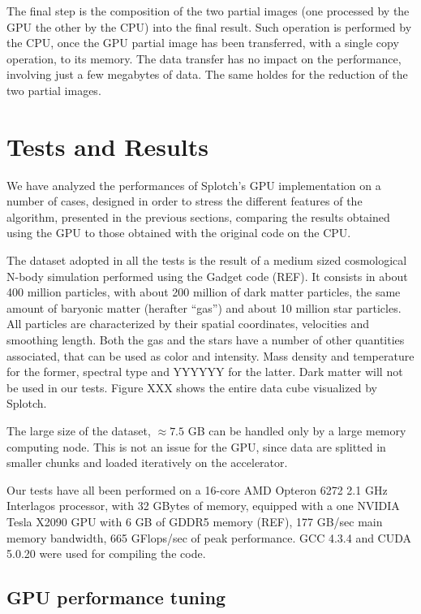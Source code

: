 \documentclass[11pt]{article}
\begin{document}
The final step is the composition of the two partial images (one processed by the
GPU the other by the CPU) into the final result. 
Such operation is performed by the CPU, 
once the GPU partial image has been transferred, with a single copy operation, to
its memory. The data transfer has no impact on the performance, involving just a few 
megabytes of data. The same holdes for the reduction of the two partial images.   

\section{Tests and Results}

We have analyzed the performances of Splotch's GPU implementation on a number of cases, designed in 
order to stress the different features of the algorithm, presented in the previous 
sections, comparing the results 
obtained using the GPU to those obtained with the original code on the CPU. 

The dataset adopted in all the tests is the result of a medium sized cosmological 
N-body simulation performed using the Gadget code (REF). It consists in about 
400 million particles, with about 200 million of dark matter particles, the same amount 
of baryonic matter (herafter ``gas'') and about 10 million star particles. 
All particles are characterized by their spatial coordinates, velocities
and smoothing length. 
Both the gas and the stars have a number of other quantities associated, that can be used 
as color and intensity. Mass density and temperature for the former, spectral type and YYYYYY
for the latter. Dark matter will not be used in our tests. Figure XXX shows 
the entire data cube visualized by Splotch.

The large size of the dataset, $\approx 7.5$ GB can be handled only by a large memory computing node. 
This is not an issue for the GPU, since data are splitted 
in smaller chunks and loaded iteratively on the accelerator. 

Our tests have all been performed on a 16-core AMD Opteron 6272 2.1 GHz Interlagos processor,
with 32 GBytes of memory, equipped with a one NVIDIA Tesla X2090 GPU with 6 GB of GDDR5 memory
(REF), 177 GB/sec 
main memory bandwidth, 665 GFlops/sec of peak performance. GCC 4.3.4 and CUDA 5.0.20 
were used for compiling the code.

\subsection{GPU performance tuning}
\end{document}
